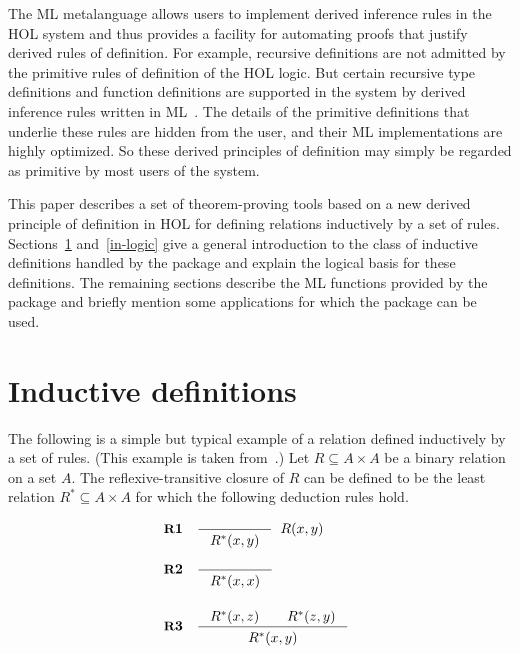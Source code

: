 The {\small ML} metalanguage allows users to implement derived inference rules
in the {\small HOL} system and thus provides a facility for automating proofs
that justify derived rules of definition.  For example, recursive
\mbox{definitions} are not admitted by the primitive rules of definition of the
{\small HOL} logic.  But certain recursive type definitions and function
definitions are supported in the system by derived inference rules written in
{\small ML}~\cite{description,melham}.  The details of the primitive
definitions that underlie these rules are hidden from the user, and their
{\small ML} implementations are highly optimized. So these \mbox{derived}
principles of definition may simply be regarded as primitive by most users of
the system.

This paper describes a set of theorem-proving tools based on a new derived
principle of definition in {\small HOL} for defining relations inductively by a
set of rules. \mbox{Sections~\ref{ind-defs}} and~\ref{in-logic} give a general
introduction to the class of inductive definitions handled by the package and
explain the logical basis for these definitions.  The remaining sections
describe the {\small ML} functions provided by the package and briefly mention
some applications for which the package can be used.

\section{Inductive definitions}\label{ind-defs}

The following is a simple but typical example of a relation defined inductively
by a set of rules. (This example is taken from~\cite{pitts}.) Let $R \subseteq
A \times A$ be a binary relation on a set $A$.  The reflexive-transitive
closure of $R$ can be defined to be the least relation $R^{*} \subseteq A
\times A$ for which the following deduction rules hold.

\medskip

\[ \begin{array}[t]{@{}l}
   \hbox{{\small\bf R}\bf 1}\quad\Rule{}{R^{*}(x,y)}\;\; R(x,y) \\[6mm]
   \hbox{{\small\bf R}\bf 2}\quad\Rule{}{R^{*}(x,x)}\\[8mm]
   \hbox{{\small\bf R}\bf 3}\quad\Rule{R^{*}(x,z)\qquad R^{*}(z,y)}
         {R^{*}(x,y)} 
\end{array} \]

\medskip

